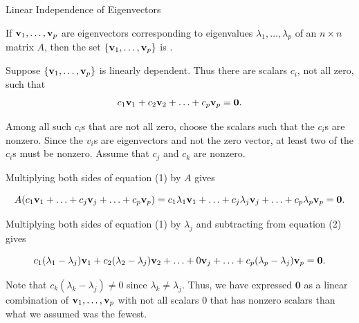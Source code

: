 \documentclass[xcolor=dvipsnames,aspectratio=169,t]{beamer}
\begin{document}
\begin{frame}{Linear Independence of Eigenvectors}
  \begin{theorem}
  If $\mathbf{v}_1,\ldots,\mathbf{v}_p$ are eigenvectors corresponding to  eigenvalues $\lambda_1, \ldots, \lambda_p$ of an $n \times n$ matrix $A$, then the set $\left\{ \mathbf{v}_1, \ldots, \mathbf{v}_p \right\}$ is .
  \end{theorem}

  \pause
  {\small
  Suppose $\left\{ \mathbf{v}_1, \ldots, \mathbf{v}_p \right\}$ is linearly dependent.
  Thus there are scalars $c_i$, not all zero, such that
  \vspace{-0.15in}
  \begin{equation}
  c_1 \mathbf{v}_1 + c_2 \mathbf{v}_2 + \ldots + c_p \mathbf{v}_p = \mathbf{0}.
  \end{equation}
  \vspace*{-0.3in}

  Among all such $c_i$s that are not all zero, choose the scalars such that the  $c_i$s are nonzero.
  Since the $v_i$s are eigenvectors and not the zero vector, at least two of the $c_i$s must be nonzero.  Assume that $c_j$ and $c_k$ are nonzero.

  \pause
  Multiplying both sides of equation (1) by $A$ gives
  \vspace{-0.15in}

  \begin{equation}
  A(c_1 \mathbf{v}_1 + \ldots +c_j \mathbf{v}_j + \ldots + c_p \mathbf{v}_p) = c_1 \lambda_1 \mathbf{v}_1 + \ldots +c_j \lambda_j \mathbf{v}_j + \ldots + c_p \lambda_p \mathbf{v}_p = \mathbf{0}.
  \end{equation}
  \vspace{-0.2in}

  \pause
  Multiplying both sides of equation (1) by $\lambda_j$ and subtracting from equation (2) gives
  \vspace{-0.15in}

  \begin{equation}
  c_1 (\lambda_1 - \lambda_j)\mathbf{v}_1 + c_2 (\lambda_2 - \lambda_j)\mathbf{v}_2 + \ldots + 0\mathbf{v}_j + \ldots + c_p (\lambda_p - \lambda_j)\mathbf{v}_p = \mathbf{0}.
  \end{equation}
  \vspace{-0.2in}

  \pause
  Note that $c_k (\lambda_k-\lambda_j)\ne 0$ since $\lambda_k\ne\lambda_j$.
  Thus, we have expressed $\mathbf{0}$ as a linear combination of $\mathbf{v}_1,\ldots,\mathbf{v}_p$ with not all scalars $0$ that has  nonzero scalars than what we assumed was the fewest. 
  \hfill\blue{\qed}
  }
\end{frame}
\end{document}
